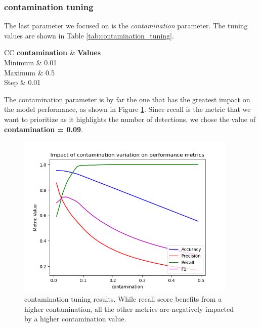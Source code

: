 \documentclass[futureinternet,article,submit,pdftex,moreauthors]{Definitions/mdpi}
\begin{document}
\subsubsection{contamination tuning}

The last parameter we focused on is the \textit{contamination} parameter. The tuning values are shown in Table \ref{tab:contamination_tuning}.

\begin{table}[H]
	\caption{contamination tuning values.}\label{tab:contamination_tuning}
	\begin{tabularx}{\textwidth}{CC}
	\toprule
	\textbf{contamination} & \textbf{Values} \\
	\midrule
	Minimum & 0.01 \\
	Maximum & 0.5 \\
	Step & 0.01 \\
	\bottomrule
	\end{tabularx}
\end{table}

The contamination parameter is by far the one that has the greatest impact on the model performance, as shown in Figure \ref{fig:contamination_tuning}.
Since recall is the metric that we want to prioritize as it highlights the number of detections, we chose the value of \textbf{contamination = 0.09}.

\begin{figure}[H]
	\centering
	\includegraphics[width=10.5cm]{img/contaminationTuning.png}
	\caption{contamination tuning results. While recall score benefits from a higher contamination, all the other metrics are negatively impacted by a higher contamination value.}\label{fig:contamination_tuning}
\end{figure}
\unskip
\end{document}
